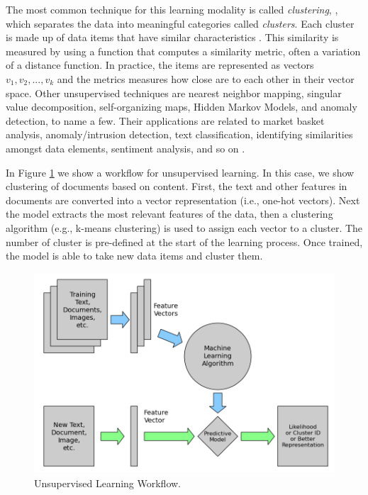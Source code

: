 \documentclass[12pt]{report}
\begin{document}
	The most common technique for this learning modality is called {\em clustering}, \cite{Russell2010}, which separates the data into meaningful categories called {\em clusters}. Each cluster is made up of data items that have similar characteristics \cite{Goodfellow2016,Nilsson1998}. This similarity is measured by using a function that computes a similarity metric, often a variation of a distance function. In practice, the items are represented as vectors $v_1,  v_2, ..., v_k$ and the metrics measures how close are to each other in their vector space. Other unsupervised techniques are nearest neighbor mapping, singular value decomposition,  self-organizing maps, Hidden Markov Models, and anomaly detection, to name a few. Their applications are related to market basket analysis, anomaly/intrusion detection, text classification, identifying similarities amongst data elements, sentiment analysis, and so on \cite{Nevala2017,Halibas2018}.
	
	In Figure \ref{figure:Unsupervised_Learning} we show a workflow for unsupervised learning. In this case, we show clustering of documents based on content. First, the text and other features in documents are converted into a vector representation (i.e., one-hot vectors). Next the model extracts the most relevant features of the data,  then a clustering algorithm (e.g., k-means clustering) is used to assign each vector to a cluster. The number of cluster is pre-defined at the start of the learning process.
	Once trained, the model is able to take new data items and cluster them.
	
	\begin{figure}[H]	
		\centering
		\includegraphics[width=150mm, scale = 1]{images/2-Unsupervised_Learning.png}	
		\caption{Unsupervised Learning Workflow.}	
		\label{figure:Unsupervised_Learning}
	\end{figure}
	
\end{document}
